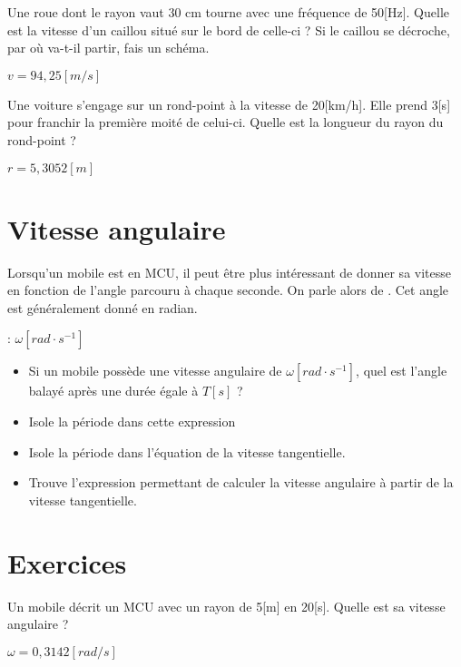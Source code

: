 \begin{exercise}
      Une roue dont le rayon vaut 30 cm tourne avec une fréquence de 50[Hz]. Quelle est la vitesse d'un caillou situé sur le bord de celle-ci ?
      Si le caillou se décroche, par où va-t-il partir, fais un schéma.
\end{exercise}
\begin{solution}
      \(v=94,25[m/s]\)
\end{solution}

\begin{exercise}
      Une voiture s'engage sur un rond-point à la vitesse de 20[km/h]. Elle prend 3[s] pour franchir la première moité de celui-ci. Quelle est la longueur du rayon du rond-point ?
\end{exercise}
\begin{solution}
      \(r=5,3052[m]\)
\end{solution}

\newpage

\section{Vitesse angulaire}
Lorsqu'un mobile est en MCU, il peut être plus intéressant de donner sa vitesse en fonction de l'angle parcouru à chaque seconde. On parle alors de . Cet angle est généralement donné en radian.
\begin{encadre}
       : \(\omega [rad \cdot s^{-1}]\)
\end{encadre}

\begin{itemize}[label=\(\rightarrow\)]
      \item Si un mobile possède une vitesse angulaire de \(\omega [rad \cdot s^{-1}]\), quel est l'angle balayé après une durée égale à \(T[s]\) ?
      \item Isole la période dans cette expression
      \item Isole la période dans l'équation de la vitesse tangentielle.
      \item Trouve l'expression permettant de calculer la vitesse angulaire à partir de la vitesse tangentielle.
\end{itemize}

\newpage

\section{Exercices}
\begin{exercise}
      Un mobile décrit un MCU avec un rayon de 5[m] en 20[s]. Quelle est sa vitesse angulaire ?
\end{exercise}
\begin{solution}
      \(\omega=0,3142[rad/s]\)
\end{solution}


